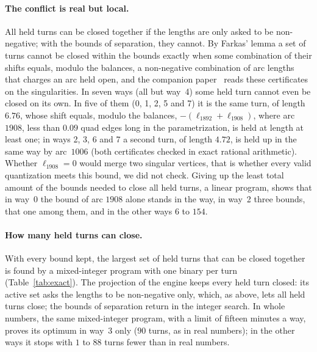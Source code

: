 \documentclass[11pt,a4paper]{article}
\begin{document}
\paragraph{The conflict is real but local.}
All held turns can be closed together if the lengths are only asked to be
non-negative; with the bounds of separation, they cannot. By Farkas' lemma a
set of turns cannot be closed within the bounds exactly when some
combination of their shifts equals, modulo the balances, a non-negative
combination of arc lengths that charges an arc held open, and the companion
paper~\cite{gardent2026turns} reads these certificates on the singularities.
In seven ways (all but way~4) some held turn cannot even be closed on its
own. In five of them (0, 1, 2, 5 and 7) it is the same turn, of length
$6.76$, whose shift equals, modulo the balances, $-(\ell_{1892} +
\ell_{1908})$, where arc $1908$, less than $0.09$ quad edges long in the
parametrization, is held at length at least one; in ways 2, 3, 6 and 7 a
second turn, of length $4.72$, is held up in the same way by arc~$1006$ (both
certificates checked in exact rational arithmetic).
Whether $\ell_{1908} = 0$ would merge two singular vertices, that is whether
every valid quantization meets this bound, we did not check. Giving up the
least total amount of the bounds needed to close all held turns, a linear
program, shows that in way~0 the bound of arc $1908$ alone stands in the
way, in way~2 three bounds, that one among them, and in the other ways $6$
to $154$.

\paragraph{How many held turns can close.}
With every bound kept, the largest set of held turns that can be closed
together is found by a mixed-integer program with one binary per turn
(Table~\ref{tab:exact}). The projection of the engine keeps every held turn
closed: its active set asks the lengths to be non-negative only, which, as
above, lets all held turns close; the bounds of separation return in the
integer search. In whole numbers, the same mixed-integer program, with a
limit of fifteen minutes a way, proves its optimum in way~3 only ($90$
turns, as in real numbers); in the other ways it stops with $1$ to $88$
turns fewer than in real numbers.
\end{document}
